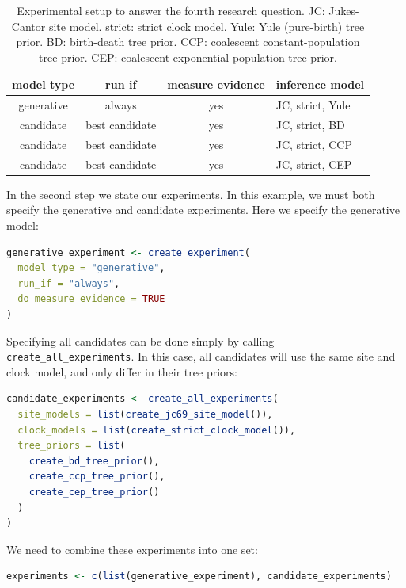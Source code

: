 \documentclass{article}
\begin{document}
\begin{table}
  \begin{tabular}{ | c | c | c | l | }
    \hline
    \textbf{model type} & \textbf{run if} & \textbf{measure evidence} & \textbf{inference model} \\ 
    \hline
    generative & always         & yes & JC, strict, Yule \\
    candidate  & best candidate & yes & JC, strict, BD \\
    candidate  & best candidate & yes & JC, strict, CCP \\
    candidate  & best candidate & yes & JC, strict, CEP \\
    \hline
  \end{tabular}
  \caption{
    Experimental setup to answer the fourth research question.
    JC: Jukes-Cantor site model.
    strict: strict clock model.
    Yule: Yule (pure-birth) tree prior.
    BD: birth-death tree prior.
    CCP: coalescent constant-population tree prior.
    CEP: coalescent exponential-population tree prior.
  }
  \label{tab:experiment_5}
\end{table}

In the second step we state our experiments. 
In this example, we must both specify the generative and candidate experiments. Here we specify the generative model:

\begin{lstlisting}[language=R, floatplacement=H, frame=single]
generative_experiment <- create_experiment(
  model_type = "generative",
  run_if = "always",
  do_measure_evidence = TRUE
)
\end{lstlisting}

Specifying all candidates can be done simply by calling \verb;create_all_experiments;. In this case, all candidates will use the same site and clock model, and only differ in their tree priors:

\begin{lstlisting}[language=R, floatplacement=H, frame=single]
candidate_experiments <- create_all_experiments(
  site_models = list(create_jc69_site_model()),
  clock_models = list(create_strict_clock_model()),
  tree_priors = list(
    create_bd_tree_prior(), 
    create_ccp_tree_prior(), 
    create_cep_tree_prior()
  )
)
\end{lstlisting}

We need to combine these experiments into one set:

\begin{lstlisting}[language=R, floatplacement=H, frame=single]
experiments <- c(list(generative_experiment), candidate_experiments)
\end{lstlisting}
\end{document}
